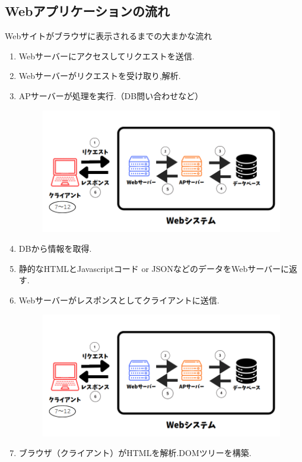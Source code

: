 \documentclass[aspectratio=169]{beamer}
\begin{document}
\subsection{Webアプリケーションの流れ}
\begin{frame}[allowframebreaks]{Webサイトがブラウザに表示されるまでの大まかな流れ}
    \begin{enumerate}
        \setlength{\parskip}{1em}
        \item Webサーバーにアクセスしてリクエストを送信.
        \item Webサーバーがリクエストを受け取り,解析.
        \item APサーバーが処理を実行.（DB問い合わせなど）
        \begin{figure}
            \includegraphics[scale=0.25]{webfloat.png}
        \end{figure}
        \newpage
        \item DBから情報を取得.
        
        \item 静的なHTMLとJavascriptコード or JSONなどのデータをWebサーバーに返す.
        \item Webサーバーがレスポンスとしてクライアントに送信.
        \begin{figure}
            \includegraphics[scale=0.25]{webfloat.png}
        \end{figure}
        \newpage
        \item ブラウザ（クライアント）がHTMLを解析.DOMツリーを構築.


\end{enumerate}
\end{frame}
\end{document}
